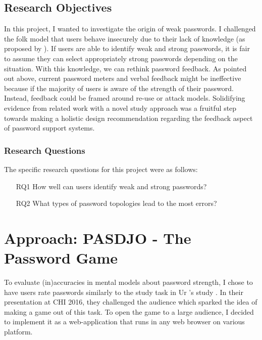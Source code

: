 \subsection{Research Objectives}
In this project, I wanted to investigate the origin of weak passwords. I challenged the folk model that users behave insecurely due to their lack of knowledge (as proposed by \ar). If users are able to identify weak and strong passwords, it is fair to assume they can select appropriately strong passwords depending on the situation. With this knowledge, we can rethink password feedback. As pointed out above, current password meters and verbal feedback might be ineffective because if the majority of users is aware of the strength of their password. Instead, feedback could be framed around re-use or attack models. Solidifying evidence from related work with a novel study approach was a fruitful step towards making a holistic design recommendation regarding the feedback aspect of password support systems. 


\subsubsection{Research Questions}
The specific research questions for this project were as follows:
\begin{itemize}
\item[RQ1] How well can users identify weak and strong passwords?
\item[RQ2] What types of password topologies lead to the most errors?
\end{itemize}



\section{Approach: PASDJO - The Password Game}
To evaluate (in)accuracies in mental models about password strength, I chose to have users rate passwords similarly to the study task in Ur \etal's study \cite{Ur2016PerceptionsPassword}. In their presentation at CHI 2016, they challenged the audience which sparked the idea of making a game out of this task. To open the game to a large audience, I decided to implement it as a web-application that runs in any web browser on various platform. 

